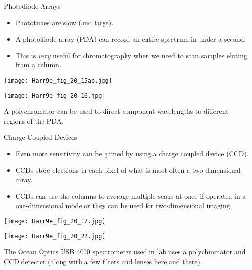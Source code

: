 \documentclass[handout]{beamer}
\begin{document}
\begin{frame}[allowframebreaks]{Photodiode Arrays}
	\begin{itemize}
		\item Phototubes are slow (and large).
		\item A photodiode array (PDA) can record an entire spectrum in
			under a second.
		\item This is \emph{very} useful for chromatography when we need
			to scan samples eluting from a column.
	\end{itemize}

	\begin{center}
		\texttt{[image: Harr9e\_fig\_20\_15ab.jpg]} \quad 
	\end{center}

	\framebreak

	\begin{center}
	\texttt{[image: Harr9e\_fig\_20\_16.jpg]}
	\end{center}

	A \alert{polychromator} can be used to direct component wavelengths to
	\alert{different regions} of the PDA.
\end{frame}

\begin{frame}[allowframebreaks]{Charge Coupled Devices}
	\begin{itemize}
		\item Even more sensitivity can be gained by using a
			\alert{charge coupled device} (CCD).
		\item CCDs \alert{store} electrons in each \alert{pixel} of what
			is most often a \alert{two-dimensional} array.
		\item CCDs can use the columns to average multiple scans at once
			if operated in a one-dimensional mode or they can be
			used for two-dimensional imaging.
	\end{itemize}

	\begin{center}
		\texttt{[image: Harr9e\_fig\_20\_17.jpg]}
	\end{center}

	\framebreak

	\begin{center}
		\texttt{[image: Harr9e\_fig\_20\_22.jpg]}
	\end{center}

	The Ocean Optics USB 4000 spectrometer used in lab uses a polychromator
	and CCD detector (along with a few filters and lenses here and there).
\end{frame}
\end{document}
